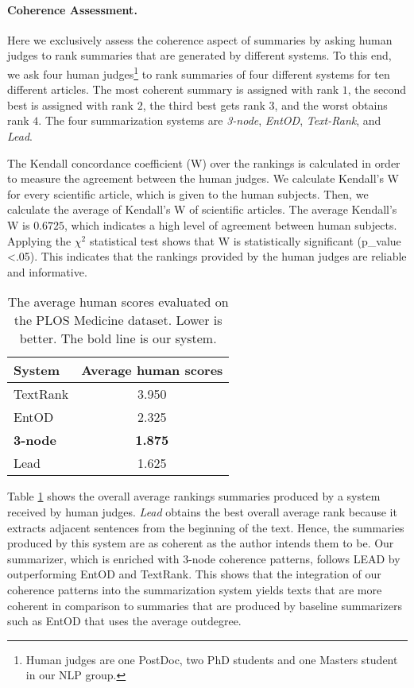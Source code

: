 \paragraph{Coherence Assessment.} 
Here we exclusively assess the coherence aspect of summaries by asking human judges to rank summaries that are generated by different systems. 
To this end, we ask four human judges\footnote{Human judges are one PostDoc, two PhD students and one Masters student in our NLP group.} to rank summaries of four different systems for ten different articles. 
The most coherent summary is assigned with rank $1$, the second best is assigned with rank $2$, the third best gets rank $3$, and the worst obtains rank $4$.
The four summarization systems are
\emph{3-node}, \emph{EntOD}, \emph{Text-Rank}, and \emph{Lead}.

The Kendall concordance coefficient (W) \cite{siegel88} over the rankings is calculated in order to measure the agreement between the human judges.  
We calculate Kendall's W for every scientific article, which is given to the human subjects. 
Then, we calculate the average of Kendall's W of scientific articles. 
The average Kendall's W is $0.6725$, which indicates a high level of agreement between human subjects.
Applying the $\chi^2$ statistical test shows that W is statistically significant (p\_value <.05).  This indicates that the rankings provided by the human judges are reliable and informative.


\begin{table}[!ht]
	\begin{center}
		\begin{tabular}{lc}
		\toprule
		\textbf{System} 				&  \textbf{Average human scores} \\
		\midrule
		TextRank 			& 3.950					\\
		EntOD 				& 2.325					\\
		\textbf{3-node}		& \textbf{1.875} 		\\
		Lead 				& 1.625					\\
		\bottomrule
		\end{tabular}
	\end{center}
	\caption{The average human scores evaluated on the PLOS Medicine dataset. Lower is better. 
	The bold line is our system.}
	\label{tab:summary-human}
\end{table}

Table \ref{tab:summary-human} shows the overall average rankings summaries produced by a system received by human judges. 
\emph{Lead} obtains the best overall average rank because it extracts adjacent sentences from the beginning of the text. 
Hence, the summaries produced by this system are as coherent as the author intends them to be. 
Our summarizer, which is enriched with 3-node coherence patterns, follows LEAD by outperforming EntOD and TextRank.  
This shows that the integration of our coherence patterns into the summarization system yields texts that are more coherent in comparison to summaries that are produced by baseline summarizers such as EntOD that uses the average outdegree.  

